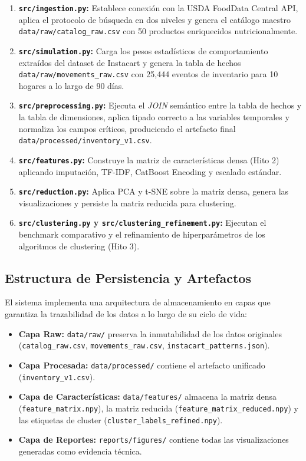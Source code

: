 \documentclass[12pt,a4paper]{article}
\newcommand{\code}[1]{\texttt{\small #1}}
\begin{document}
\begin{enumerate}
    \item \textbf{\code{src/ingestion.py}:} Establece conexión con la USDA FoodData Central API, aplica el protocolo de búsqueda en dos niveles y genera el catálogo maestro \code{data/raw/catalog\_raw.csv} con 50 productos enriquecidos nutricional\-mente.
    \item \textbf{\code{src/simulation.py}:} Carga los pesos estadísticos de comportamiento extraídos del dataset de Instacart y genera la tabla de hechos \code{data/raw/movements\_raw.csv} con 25{,}444 eventos de inventario para 10 hogares a lo largo de 90 días.
    \item \textbf{\code{src/preprocessing.py}:} Ejecuta el \textit{JOIN} semántico entre la tabla de hechos y la tabla de dimensiones, aplica tipado correcto a las variables temporales y normaliza los campos críticos, produciendo el artefacto final \code{data/processed/inventory\_v1.csv}.
    \item \textbf{\code{src/features.py}:} Construye la matriz de características densa (Hito 2) aplicando imputación, TF-IDF, CatBoost Encoding y escalado estándar.
    \item \textbf{\code{src/reduction.py}:} Aplica PCA y t-SNE sobre la matriz densa, genera las visualizaciones y persiste la matriz reducida para clustering.
    \item \textbf{\code{src/clustering.py} y \code{src/clustering\_refinement.py}:} Ejecutan el benchmark comparativo y el refinamiento de hiperparámetros de los algoritmos de clustering (Hito 3).
\end{enumerate}

\subsection{Estructura de Persistencia y Artefactos}

El sistema implementa una arquitectura de almacenamiento en capas que garantiza la trazabilidad de los datos a lo largo de su ciclo de vida:

\begin{itemize}
    \item \textbf{Capa Raw:} \code{data/raw/} preserva la inmutabilidad de los datos originales (\code{catalog\_raw.csv}, \code{movements\_raw.csv}, \code{instacart\_patterns.json}).
    \item \textbf{Capa Procesada:} \code{data/processed/} contiene el artefacto unificado (\code{inventory\_v1.csv}).
    \item \textbf{Capa de Características:} \code{data/features/} almacena la matriz densa (\code{feature\_matrix.npy}), la matriz reducida (\code{feature\_matrix\_reduced.npy}) y las etiquetas de cluster (\code{cluster\_labels\_refined.npy}).
    \item \textbf{Capa de Reportes:} \code{reports/figures/} contiene todas las visualizaciones generadas como evidencia técnica.
\end{itemize}
\end{document}
